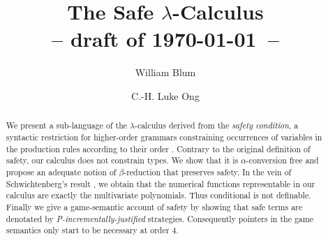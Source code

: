 \documentclass{llncs}
\begin{document}
\frontmatter          %
\pagestyle{headings}  %

\mainmatter              %

\title{The Safe $\lambda$-Calculus \\ {\small -- draft of \today\ -- }}



\author{William Blum \and C.-H. Luke Ong}
%
%



\maketitle              %

\pagestyle{empty}



\begin{abstract}
We present a sub-language of the $\lambda$-calculus derived from the \emph{safety condition}, a syntactic restriction for higher-order grammars constraining occurrences of variables in the production rules according to their order \cite{KNU02}. 
Contrary to the original definition of safety, our calculus does not constrain types.
We show that it is $\alpha$-conversion free and propose an adequate notion of $\beta$-reduction that preserves safety.
In the vein of Schwichtenberg's result 
\cite{citeulike:622637}, we obtain that the numerical functions representable in our calculus are exactly the multivariate polynomials. Thus conditional is not definable.
Finally we give a game-semantic account of safety by showing that safe terms are denotated by \emph{P-incrementally-justified} strategies. 
Consequently pointers in the game semantics only start to be necessary at order $4$.
\end{abstract}
\end{document}
